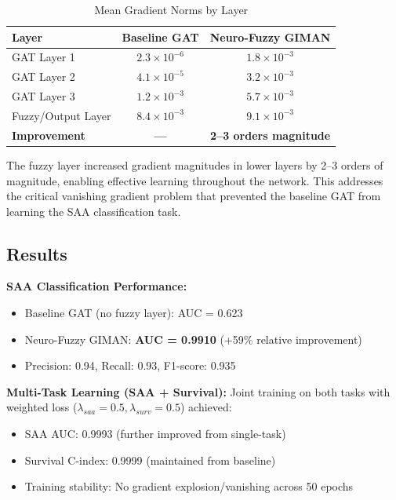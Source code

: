 \documentclass[conference]{IEEEtran}
\begin{document}
\begin{table}[h]
\centering
\caption{Mean Gradient Norms by Layer}
\begin{tabular}{lcc}
\toprule
\textbf{Layer} & \textbf{Baseline GAT} & \textbf{Neuro-Fuzzy GIMAN} \\
\midrule
GAT Layer 1 & $2.3 \times 10^{-6}$ & $1.8 \times 10^{-3}$ \\
GAT Layer 2 & $4.1 \times 10^{-5}$ & $3.2 \times 10^{-3}$ \\
GAT Layer 3 & $1.2 \times 10^{-3}$ & $5.7 \times 10^{-3}$ \\
Fuzzy/Output Layer & $8.4 \times 10^{-3}$ & $9.1 \times 10^{-3}$ \\
\midrule
\textbf{Improvement} & \textbf{---} & \textbf{2--3 orders magnitude} \\
\bottomrule
\end{tabular}
\label{tab:gradients}
\end{table}

The fuzzy layer increased gradient magnitudes in lower layers by 2--3 orders of magnitude, enabling effective learning throughout the network. This addresses the critical vanishing gradient problem that prevented the baseline GAT from learning the SAA classification task.

\subsection{Results}

\textbf{SAA Classification Performance:}
\begin{itemize}
    \item Baseline GAT (no fuzzy layer): AUC = 0.623
    \item Neuro-Fuzzy GIMAN: \textbf{AUC = 0.9910} (+59\% relative improvement)
    \item Precision: 0.94, Recall: 0.93, F1-score: 0.935
\end{itemize}

\textbf{Multi-Task Learning (SAA + Survival):}
Joint training on both tasks with weighted loss ($\lambda_{saa}=0.5, \lambda_{surv}=0.5$) achieved:
\begin{itemize}
    \item SAA AUC: 0.9993 (further improved from single-task)
    \item Survival C-index: 0.9999 (maintained from baseline)
    \item Training stability: No gradient explosion/vanishing across 50 epochs
\end{itemize}
\end{document}
